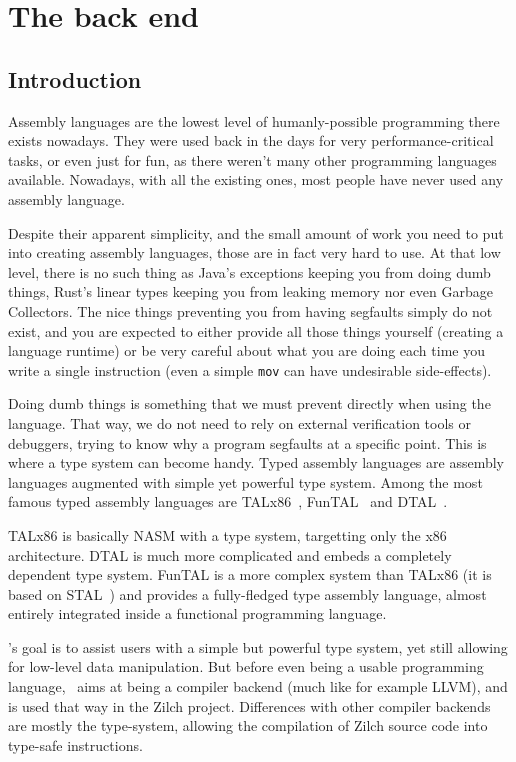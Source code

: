 \part{The back end}\label{part:nstar}


\chapter{Introduction}\label{chap:nstar-abstract}

Assembly languages are the lowest level of humanly-possible programming there exists nowadays. They were used back in the days for very performance-critical tasks, or even just for fun, as there weren't many other programming languages available. Nowadays, with all the existing ones, most people have never used any assembly language.

Despite their apparent simplicity, and the small amount of work you need to put into creating assembly languages, those are in fact very hard to use. At that low level, there is no such thing as Java's exceptions keeping you from doing dumb things, Rust's linear types keeping you from leaking memory nor even Garbage Collectors. The nice things preventing you from having segfaults simply do not exist, and you are expected to either provide all those things yourself (creating a language runtime) or be very careful about what you are doing each time you write a single instruction (even a simple \texttt{mov} can have undesirable side-effects).

Doing dumb things is something that we must prevent directly when using the language. That way, we do not need to rely on external verification tools or debuggers, trying to know why a program segfaults at a specific point.
This is where a type system can become handy. Typed assembly languages are assembly languages augmented with simple yet powerful type system. Among the most famous typed assembly languages are TALx86~\cite{TALx86}, FunTAL~\cite{FunTAL} and DTAL~\cite{DTAL}.

TALx86 is basically NASM with a type system, targetting only the x86 architecture. DTAL is much more complicated and embeds a completely dependent type system. FunTAL is a more complex system than TALx86 (it is based on STAL~\cite{STAL}) and provides a fully-fledged type assembly language, almost entirely integrated inside a functional programming language.

\vspace{\baselineskip}

\nstar's goal is to assist users with a simple but powerful type system, yet still allowing for low-level data manipulation.
But before even being a usable programming language, \nstar\ aims at being a compiler backend (much like for example LLVM), and is used that way in the Zilch project. Differences with other compiler backends are mostly the type-system, allowing the compilation of Zilch source code into type-safe instructions.

